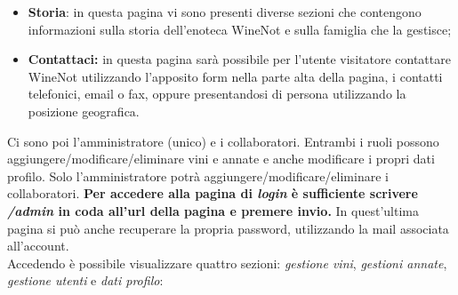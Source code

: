 \begin{itemize}
	\item \textbf{Storia}: in questa pagina vi sono presenti diverse sezioni che contengono informazioni sulla storia dell'enoteca WineNot e sulla famiglia che la gestisce;
	\item \textbf{Contattaci:} in questa pagina sarà possibile per l'utente visitatore contattare WineNot utilizzando l'apposito form nella parte alta della pagina, i contatti telefonici, email o fax, oppure presentandosi di persona utilizzando la posizione geografica.
\end{itemize}

Ci sono poi l'amministratore (unico) e i collaboratori. Entrambi i ruoli possono aggiungere/modificare/eliminare vini e annate e anche modificare i propri dati profilo. Solo l'amministratore potrà aggiungere/modificare/eliminare i collaboratori.
\textbf{Per accedere alla pagina di \textit{login} è sufficiente scrivere \textit{/admin} in coda all'url della pagina e premere invio.} In quest'ultima pagina si può anche recuperare la propria password, utilizzando la mail associata all'account.\\
Accedendo è possibile visualizzare quattro sezioni: \textit{gestione vini}, \textit{gestioni annate}, \textit{gestione utenti} e \textit{dati profilo}:

